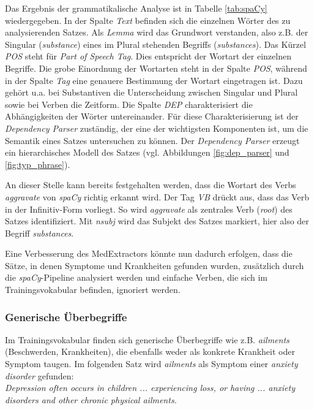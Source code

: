 Das Ergebnis der grammatikalische Analyse ist in Tabelle \ref{tab:spaCy} wiedergegeben. In der Spalte \emph{Text} befinden sich die einzelnen Wörter des zu analysierenden Satzes. Als \emph{Lemma} wird das Grundwort verstanden, also z.B. der Singular (\emph{substance}) eines im Plural stehenden Begriffs (\emph{substances}). 
Das Kürzel \emph{POS} steht für \emph{Part of Speech Tag}. Dies entspricht der Wortart der einzelnen Begriffe. Die grobe Einordnung der Wortarten steht in der Spalte \emph{POS}, während in der Spalte \emph{Tag} eine genauere Bestimmung der Wortart eingetragen ist. Dazu gehört u.a. bei Substantiven die Unterscheidung zwischen Singular und Plural sowie bei Verben die Zeitform. Die Spalte \emph{DEP} charakterisiert die Abhängigkeiten der Wörter untereinander. Für diese Charakterisierung ist der \emph{Dependency Parser} zuständig, der eine der wichtigsten Komponenten ist, um die Semantik eines Satzes untersuchen zu können. Der \emph{Dependency Parser} erzeugt ein hierarchisches Modell des Satzes (vgl. Abbildungen \ref{fig:dep_parser} und \ref{fig:typ_phrase}).

An dieser Stelle kann bereits festgehalten werden, dass die Wortart des Verbs \emph{aggravate} von \emph{spaCy} richtig erkannt wird. Der Tag \emph{VB} drückt aus, dass das Verb in der Infinitiv-Form vorliegt.  So wird \emph{aggravate} als zentrales Verb (\emph{root}) des Satzes identifiziert. Mit \emph{nsubj} wird das Subjekt des Satzes markiert, hier also der Begriff \emph{substances}.

Eine Verbesserung des MedExtractors könnte nun dadurch erfolgen, dass die Sätze, in denen Symptome und Krankheiten gefunden wurden, zusätzlich durch die \emph{spaCy}-Pipeline analysiert werden und einfache Verben, die sich im Trainingsvokabular befinden, ignoriert werden.

\subsubsection{Generische Überbegriffe}
\label{subsec: generisch} 

Im Trainingsvokabular finden sich generische Überbegriffe wie z.B. \emph{ailments} (Beschwerden, Krankheiten), die ebenfalls weder als konkrete Krankheit oder Symptom taugen. Im folgenden Satz wird \emph{ailments} als Symptom einer \emph{anxiety disorder} gefunden:\\

\emph{\glqq Depression often occurs in children ... experiencing loss, or having ... anxiety disorders and other chronic physical ailments.\grqq}\\


